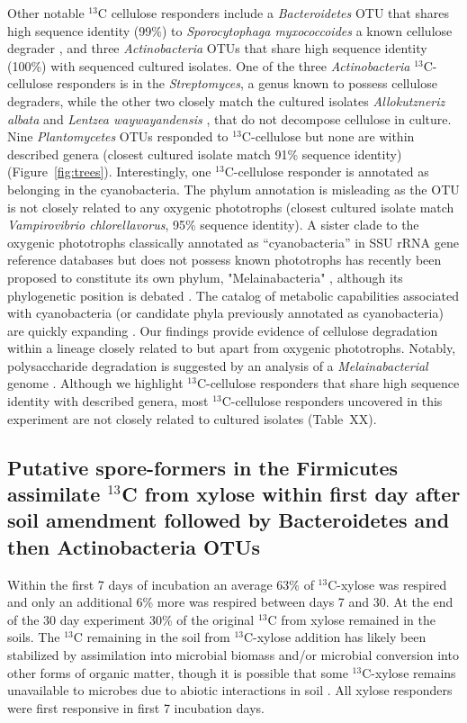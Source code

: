 Other notable $^{13}$C cellulose responders include a \textit{Bacteroidetes}
OTU that shares high sequence identity (99\%) to \textit{Sporocytophaga
myxococcoides} a known cellulose degrader \citep{Vance_1980}, and three
\textit{Actinobacteria} OTUs that share high sequence identity (100\%) with
sequenced cultured isolates. One of the three \textit{Actinobacteria}
$^{13}$C-cellulose responders is in the \textit{Streptomyces}, a genus known to
possess cellulose degraders, while the other two closely match the cultured isolates
\textit{Allokutzneriz albata} \citep{Labeda_2008, Tomita_1993} and
\textit{Lentzea waywayandensis} \citep{LABEDA_1989, Labeda_2001}, that do not
decompose cellulose in culture. Nine \textit{Plantomycetes} OTUs responded to
$^{13}$C-cellulose but none are within described genera (closest cultured isolate
match 91\% sequence identity) (Figure~\ref{fig:trees}). Interestingly, one
$^{13}$C-cellulose responder is annotated as belonging in the
cyanobacteria. The phylum annotation is misleading as the OTU is not
closely related to any oxygenic phototrophs (closest cultured isolate match
\textit{Vampirovibrio chlorellavorus}, 95\% sequence identity). A sister clade
to the oxygenic phototrophs classically annotated as ``cyanobacteria'' in
SSU rRNA gene reference databases but does not possess known phototrophs has
recently been proposed to constitute its own phylum, "Melainabacteria"
\citet{Di_Rienzi_2013}, although its phylogenetic position is debated
\citep{Soo_2014}. The catalog of metabolic capabilities associated with
cyanobacteria (or candidate phyla previously annotated as
cyanobacteria) are quickly expanding \citep{Di_Rienzi_2013, Soo_2014}.
Our findings provide evidence of cellulose degradation within a lineage closely
related to but apart from oxygenic phototrophs. Notably, polysaccharide
degradation is suggested by an analysis of a \textit{Melainabacterial} genome
\citep{Di_Rienzi_2013}. Although we highlight $^{13}$C-cellulose responders
that share high sequence identity with described genera, most
$^{13}$C-cellulose responders uncovered in this experiment are not closely
related to cultured isolates (Table~XX).

\subsection{Putative spore-formers in the Firmicutes assimilate $^{13}$C from
xylose within first day after soil amendment followed by Bacteroidetes and then
Actinobacteria OTUs} 
Within the first 7 days of incubation an average 63\% of $^{13}$C-xylose was
respired and only an additional 6\% more was respired between days 7 and 30. At
the end of the 30 day experiment 30\% of the original $^{13}$C from xylose
remained in the soils. The $^{13}$C remaining in the soil from $^{13}$C-xylose
addition has likely been stabilized by assimilation into microbial biomass
and/or microbial conversion into other forms of organic matter, though it is
possible that some $^{13}$C-xylose remains unavailable to microbes due to
abiotic interactions in soil \citep{Kalbitz_2000}. All xylose
responders were first responsive in first 7 incubation days. 

